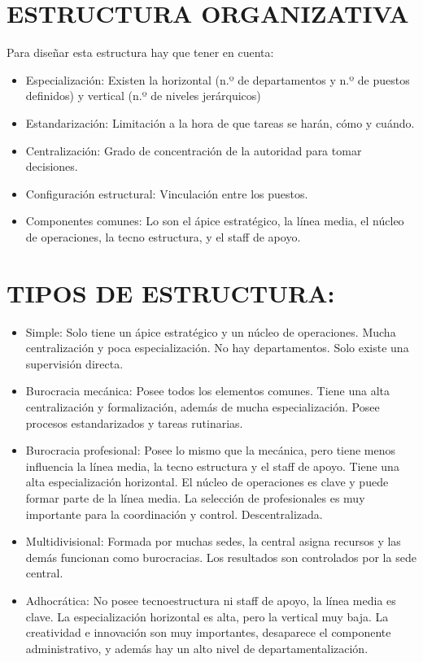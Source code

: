 \documentclass[12pt, twoside, openright]{report} %
\begin{document}
\section{ESTRUCTURA ORGANIZATIVA}
Para diseñar esta estructura hay que tener en cuenta:
\begin{itemize}
	\item Especialización: Existen la horizontal (n.º de departamentos y n.º de puestos definidos) y vertical (n.º de niveles jerárquicos)
	\item Estandarización: Limitación a la hora de que tareas se harán, cómo y cuándo.
	\item Centralización: Grado de concentración de la autoridad para tomar decisiones.
	\item Configuración estructural: Vinculación entre los puestos.
	\item Componentes comunes: Lo son el ápice estratégico, la línea media, el núcleo de operaciones,
	      la tecno estructura, y el staff de apoyo.
\end{itemize}

\section{TIPOS DE ESTRUCTURA:}
\begin{itemize}
	\item Simple: Solo tiene un ápice estratégico y un núcleo de operaciones. Mucha centralización y poca especialización. No hay departamentos. Solo existe una supervisión directa.
	\item Burocracia mecánica: Posee todos los elementos comunes. Tiene una alta centralización y formalización, además de mucha especialización. Posee procesos estandarizados y tareas rutinarias.
	\item Burocracia profesional: Posee lo mismo que la mecánica, pero tiene menos influencia la línea media, la tecno estructura y el staff de apoyo. Tiene una alta especialización horizontal. El núcleo de operaciones es clave y puede formar parte de la línea media. La selección de profesionales es muy importante para la coordinación y control. Descentralizada.
	\item Multidivisional: Formada por muchas sedes, la central asigna recursos y las demás funcionan como burocracias. Los resultados son controlados por la sede central.
	\item Adhocrática: No posee tecnoestructura ni staff de apoyo, la línea media es clave. La especialización horizontal es alta, pero la vertical muy baja. La creatividad e innovación son muy importantes, desaparece el componente administrativo, y además hay un alto nivel de departamentalización.
\end{itemize}
\pagebreak
\end{document}

